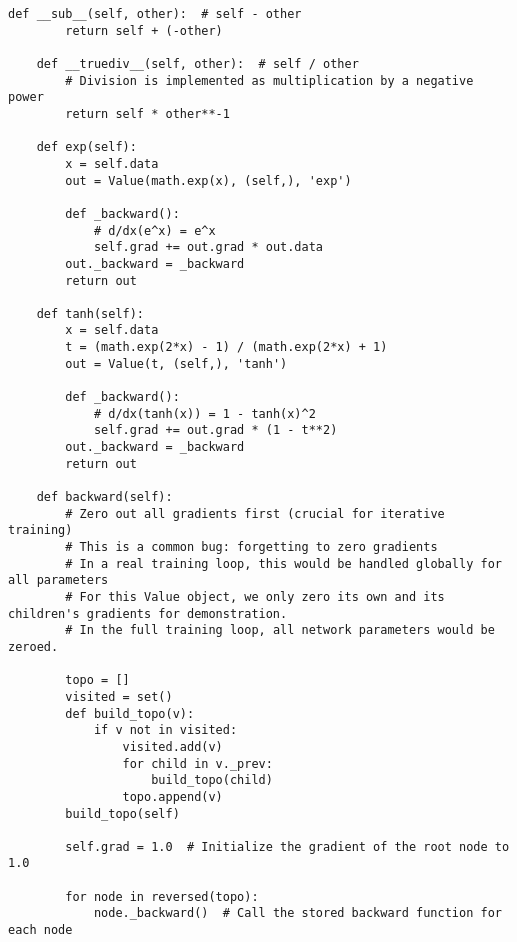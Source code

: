 \begin{lstlisting}[caption={Adding Arithmetic Operations to Value}]
    def __sub__(self, other):  # self - other
        return self + (-other)

    def __truediv__(self, other):  # self / other
        # Division is implemented as multiplication by a negative power
        return self * other**-1

    def exp(self):
        x = self.data
        out = Value(math.exp(x), (self,), 'exp')

        def _backward():
            # d/dx(e^x) = e^x
            self.grad += out.grad * out.data
        out._backward = _backward
        return out

    def tanh(self):
        x = self.data
        t = (math.exp(2*x) - 1) / (math.exp(2*x) + 1)
        out = Value(t, (self,), 'tanh')

        def _backward():
            # d/dx(tanh(x)) = 1 - tanh(x)^2
            self.grad += out.grad * (1 - t**2)
        out._backward = _backward
        return out

    def backward(self):
        # Zero out all gradients first (crucial for iterative training)
        # This is a common bug: forgetting to zero gradients
        # In a real training loop, this would be handled globally for all parameters
        # For this Value object, we only zero its own and its children's gradients for demonstration.
        # In the full training loop, all network parameters would be zeroed.
        
        topo = []
        visited = set()
        def build_topo(v):
            if v not in visited:
                visited.add(v)
                for child in v._prev:
                    build_topo(child)
                topo.append(v)
        build_topo(self)

        self.grad = 1.0  # Initialize the gradient of the root node to 1.0

        for node in reversed(topo):
            node._backward()  # Call the stored backward function for each node
\end{lstlisting}

